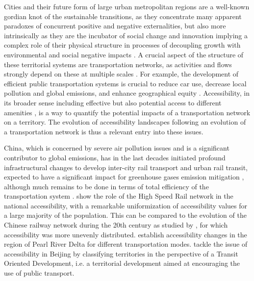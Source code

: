 \documentclass[11pt]{article}
\begin{document}
Cities and their future form of large urban metropolitan regions are a well-known gordian knot of the sustainable transitions, as they concentrate many apparent paradoxes of concurrent positive and negative externalities, but also more intrinsically as they are the incubator of social change and innovation \citep{pumain2009innovation} implying a complex role of their physical structure in processes of decoupling growth with environmental and social negative impacts \citep{bergeaud2018bel}. A crucial aspect of the structure of these territorial systems are transportation networks, as activities and flows strongly depend on these at multiple scales \citep{raimbault2018caracterisation}. For example, the development of efficient public transportation systems is crucial to reduce car use, decrease local pollution and global emissions, and enhance geographical equity \citep{sinha2003sustainability}. Accessibility, in its broader sense including effective but also potential access to different amenities \citep{bavoux2005geographie}, is a way to quantify the potential impacts of a transportation network on a territory. The evolution of accessibility landscapes following an evolution of a transportation network is thus a relevant entry into these issues.

China, which is concerned by severe air pollution issues and is a significant contributor to global emissions, has in the last decades initiated profound infrastructural changes to develop inter-city rail transport and urban rail transit, expected to have a significant impact for greenhouse gases emission mitigation \citep{han2008system}, although much remains to be done in terms of total efficiency of the transportation system \citep{chang2013environmental}. \cite{jiao2014impacts} show the role of the High Speed Rail network in the national accessibility, with a remarkable uniformization of accessibility values for a large majority of the population. This can be compared to the evolution of the Chinese railway network during the 20th century as studied by \cite{wang2009spatiotemporal}, for which accessibility was more unevenly distributed. \cite{hou2011transport} establish accessibility changes in the region of Pearl River Delta for different transportation modes. \cite{lyu2016developing} tackle the issue of accessibility in Beijing by classifying territories in the perspective of a Transit Oriented Development, i.e. a territorial development aimed at encouraging the use of public transport.
\end{document}
